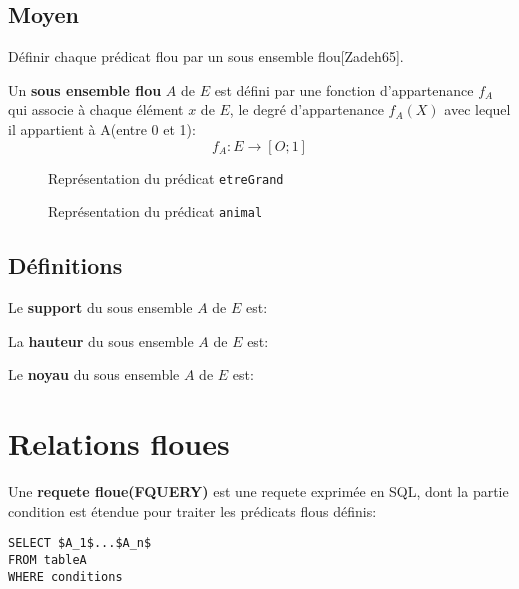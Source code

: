 \documentclass[a4paper,11pt]{article}
\begin{document}
\subsection{Moyen}
Définir chaque prédicat flou par un sous ensemble flou[Zadeh65].

Un \textbf{sous ensemble flou} $A$ de $E$ est défini par une fonction d'appartenance $f_A$ qui associe à chaque élément $x$ de $E$, le degré d'appartenance $f_A(X)$ avec lequel il appartient à A(entre 0 et 1):$$f_A:E\rightarrow[O;1]$$

		\begin{figure}[!h]
			\centering
			
			\caption{Représentation du prédicat \texttt{etreGrand}}
		\end{figure}
		
		\begin{figure}[!h]
			\centering
			
			\caption{Représentation du prédicat \texttt{animal}}
		\end{figure}
		
\subsection{Définitions}

Le \textbf{support} du sous ensemble $A$ de $E$ est: \begin{center}  \end{center}

La \textbf{hauteur} du sous ensemble $A$ de $E$ est: \begin{center}  \end{center}

Le \textbf{noyau} du sous ensemble $A$ de $E$ est: \begin{center}  \end{center}

\section{Relations floues}
Une \textbf{requete floue(FQUERY)} est une requete exprimée en SQL, dont la partie condition est étendue pour traiter les prédicats flous définis:\\

\begin{lstlisting}[mathescape]
SELECT $A_1$...$A_n$
FROM tableA
WHERE conditions
\end{lstlisting}
~
\end{document}
